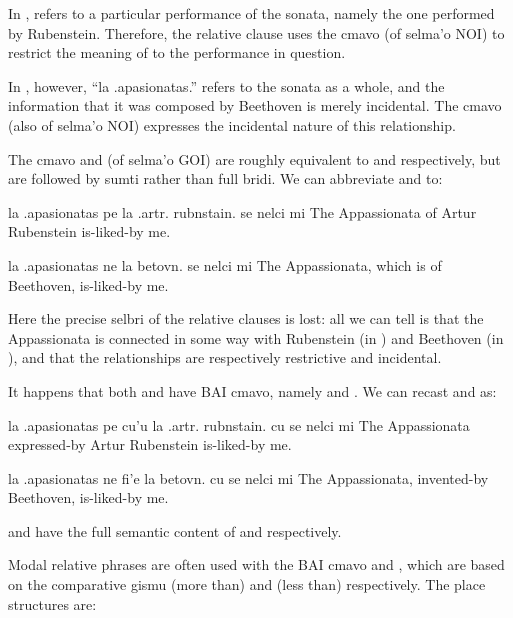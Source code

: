In , 
    refers to a particular performance of the sonata, namely the
    one performed by Rubenstein. Therefore, the relative clause
     uses the cmavo  (of selma'o NOI) to
    restrict the meaning of  to the performance
    in question. 

In , however, ``la
    .apasionatas.'' refers to the sonata as a whole, and the
    information that it was composed by Beethoven is merely
    incidental. The cmavo  (also of selma'o NOI) expresses
    the incidental nature of this relationship.

The cmavo  and  (of selma'o GOI) are roughly
    equivalent to  and  respectively, but are
    followed by sumti rather than full bridi. We can abbreviate  and  to:
\begin{example}
la .apasionatas pe la .artr. rubnstain. se nelci mi\n
The Appassionata of Artur Rubenstein is-liked-by me.
\end{example}

\begin{example}
la .apasionatas ne la betovn. se nelci mi\n
The Appassionata, which is of Beethoven, is-liked-by me.
\end{example}

Here the precise selbri of the relative clauses is lost: all we
    can tell is that the Appassionata is connected in some way with
    Rubenstein (in ) and Beethoven
    (in ), and that the
    relationships are respectively restrictive and incidental. 

It happens that both  and  have BAI cmavo,
    namely  and . We can recast  and  as:
\begin{example}
la .apasionatas pe cu'u la .artr. rubnstain.\n
\T	cu se nelci mi\n
The Appassionata expressed-by Artur Rubenstein\n
\T	is-liked-by me.
\end{example}

\begin{example}
la .apasionatas ne fi'e la betovn.\n
\T	cu se nelci mi\n
The Appassionata, invented-by Beethoven,\n
\T	is-liked-by me.
\end{example}

 and  have the full semantic content of  and  respectively. 

Modal relative phrases are often used with the BAI cmavo
     and , which are based on the comparative gismu
     (more than) and  (less than) respectively.
    The place structures are:

